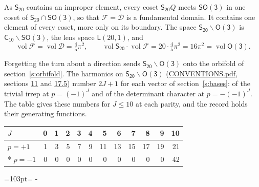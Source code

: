 \documentclass[10pt,a4paper]{article}
\newcommand{\needspace}[1]{\par\penalty-100\begingroup\dimen0=#1\relax\dimen2=\pagegoal
  \advance\dimen2-\pagetotal\ifdim\dimen0>\dimen2\relax\ifdim\dimen2>0pt\vfil\break\fi\fi
  \endgroup}
\numberwithin{equation}{section}
\newcommand{\grp}[1]{\mathsf{#1}}
\newcommand{\vol}{\operatorname{vol}}
\newcommand{\fcell}{\mathcal{D}}
\newcommand{\fdomain}{\mathcal{F}}
\newcommand{\lensspace}[2]{\mathsf{L}(#1, #2)}
\begin{document}
\leavevmode\label{n:set.fundamental}As $\grp{S_{20}}$ contains an improper element, every coset $\grp{S_{20}}Q$ meets \href{SO3.pdf}{$\grp{SO(3)}$} in one coset of $\grp{S_{20}} \cap \grp{SO(3)}$, so that $\fdomain = \fcell$ is a fundamental domain. It contains one element of every coset, more only on its boundary.
\leavevmode\label{n:set.lens}The space $\grp{S_{20}}\backslash\grp{O(3)}$ is $\grp{C_{10}}\backslash\grp{SO(3)}$, the lens space $\lensspace{20}{1}$, and
\begin{equation}\label{e:volume}\vol\fdomain = \vol\fcell = \tfrac{4}{5}\pi^2,\qquad \vol\grp{S_{20}}\cdot\vol\fdomain = 20\cdot \tfrac{4}{5}\pi^2 = 16\pi^2 = \vol\grp{O(3)}.\end{equation}

Forgetting the turn about a direction sends $\grp{S_{20}}\backslash\grp{O(3)}$ onto the orbifold of section~\ref{s:orbifold}.
The harmonics on $\grp{S_{20}}\backslash\grp{O(3)}$ (\href{../../CONVENTIONS.pdf}{CONVENTIONS.pdf}, sections \href{../../CONVENTIONS.pdf\#conv.11}{11} and \href{../../CONVENTIONS.pdf\#conv.17.5}{17.5}) number $2J + 1$ for each vector of section~\ref{s:bases}: of the trivial irrep at $p = (-1)^J$ and of the determinant character at $p = -(-1)^J$. The table gives these numbers for $J \le 10$ at each parity, and the record holds their generating functions.
{\small\setlength{\tabcolsep}{4pt}\begin{longtable}{@{}lrrrrrrrrrrr@{}}\toprule
$J$ & 0 & 1 & 2 & 3 & 4 & 5 & 6 & 7 & 8 & 9 & 10\\\midrule\endhead
\bottomrule\endfoot\endlastfoot
$p = +1$ & 1 & 3 & 5 & 7 & 9 & 11 & 13 & 15 & 17 & 19 & 21\\*
$p = -1$ & 0 & 0 & 0 & 0 & 0 & 0 & 0 & 0 & 0 & 0 & 42\\
\bottomrule\end{longtable}}
\needspace{103pt}
\end{document}
